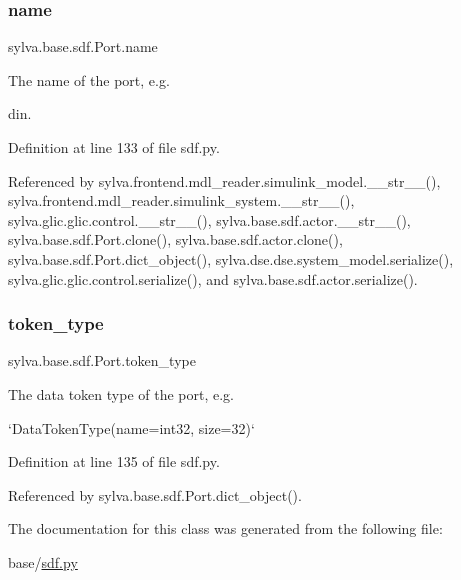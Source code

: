\mbox{\label{classsylva_1_1base_1_1sdf_1_1_port_aa8aa0ac5a7e375e2c0cb6e92a0b1dd20}} 
\subsubsection{\texorpdfstring{name}{name}}
{\footnotesize\ttfamily sylva.\+base.\+sdf.\+Port.\+name}



The name of the port, e.\+g. 

{\ttfamily din}. 

Definition at line 133 of file sdf.\+py.



Referenced by sylva.\+frontend.\+mdl\+\_\+reader.\+simulink\+\_\+model.\+\_\+\+\_\+str\+\_\+\+\_\+(), sylva.\+frontend.\+mdl\+\_\+reader.\+simulink\+\_\+system.\+\_\+\+\_\+str\+\_\+\+\_\+(), sylva.\+glic.\+glic.\+control.\+\_\+\+\_\+str\+\_\+\+\_\+(), sylva.\+base.\+sdf.\+actor.\+\_\+\+\_\+str\+\_\+\+\_\+(), sylva.\+base.\+sdf.\+Port.\+clone(), sylva.\+base.\+sdf.\+actor.\+clone(), sylva.\+base.\+sdf.\+Port.\+dict\+\_\+object(), sylva.\+dse.\+dse.\+system\+\_\+model.\+serialize(), sylva.\+glic.\+glic.\+control.\+serialize(), and sylva.\+base.\+sdf.\+actor.\+serialize().

\mbox{\label{classsylva_1_1base_1_1sdf_1_1_port_a3bc0e05af490f897794a9781127c69e3}} 
\subsubsection{\texorpdfstring{token\+\_\+type}{token\_type}}
{\footnotesize\ttfamily sylva.\+base.\+sdf.\+Port.\+token\+\_\+type}



The data token type of the port, e.\+g. 

`\+Data\+Token\+Type(name=\textquotesingle{}int32\textquotesingle{}, size=32)` 

Definition at line 135 of file sdf.\+py.



Referenced by sylva.\+base.\+sdf.\+Port.\+dict\+\_\+object().



The documentation for this class was generated from the following file\+:\begin{DoxyCompactItemize}
\item 
base/\hyperlink{sdf_8py}{sdf.\+py}\end{DoxyCompactItemize}
